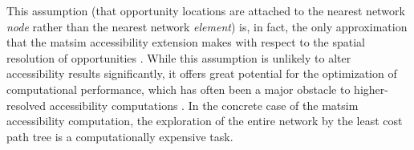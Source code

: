 %
%

%
%
This assumption (\ie that opportunity locations are attached to the nearest network \emph{node} rather than
the nearest network \emph{element}) is, in fact, the only approximation that the \gls{matsim} accessibility
extension makes with respect to the spatial resolution of opportunities 
\citep{NicolaiNagelHiResAccessibilityMethod}. While this assumption is unlikely to alter accessibility 
results significantly, it offers great potential for the optimization of computational performance, which
has often been a major obstacle to higher-resolved accessibility computations
\citep{Kwan1998PointBasedAccessibility, BuettnerEtAl2010Erreichbarkeitsatlas}. 
In the concrete case of the \gls{matsim} accessibility computation, the exploration of the entire network 
by the least cost path tree is a computationally expensive task.

